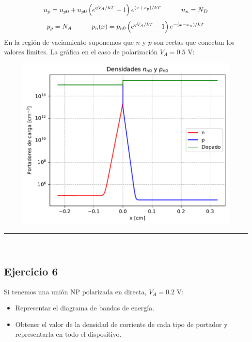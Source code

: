\begin{itemize}
    \begin{equation*}
        n_{p} = n_{p0} + n_{p0} \left( e^{qV_A/kT}-1 \right) e^{(x+x_p)/kT}  \quad \quad \quad  n_n = N_D
    \end{equation*}
    \begin{equation*}
        p_{p} = N_A \quad \quad \quad p_{n} (x) = p_{n0} \left( e^{qV_A/kT}-1 \right) e^{-(x-x_n)/kT}  
    \end{equation*}
    En la región de vaciamiento suponemos que $n$ y $p$ son rectas que conectan los valores límites. La gráfica en el caso de polarización $V_A=0.5$ V: 
    \begin{figure}[h!] \centering
        \includegraphics[width=0.7\linewidth]{Cuerpo/Ch_03/03_05_02.pdf}
    \end{figure}

\end{itemize}



\rule{\textwidth}{0.1pt} \\[2pt]




\subsection{Ejercicio 6} 

Si tenemos una unión NP polarizada en directa, $V_A = 0.2$ V:

\begin{itemize}
    \item Representar el diagrama de bandas de energía.
    \item Obtener el valor de la densidad de corriente de cada tipo de portador y representarla en todo el dispositivo.
\end{itemize}

